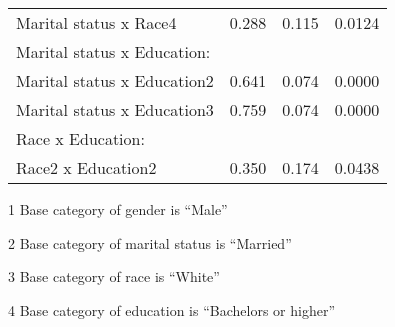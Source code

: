 \begin{table}[H]
\begin{threeparttable}
\begin{tabular}{lrcr}
  \hspace{5pt}   Marital status x Race4 		& 0.288		& 0.115 & 0.0124 \\ 
Marital status x Education: & & & \\
  \hspace{5pt}   Marital status x Education2 		& 0.641		& 0.074 & 0.0000 \\ 
  \hspace{5pt}   Marital status x Education3 		& 0.759		& 0.074 & 0.0000 \\ 
Race x Education: & & & \\
  \hspace{5pt}   Race2 x Education2 			& 0.350		& 0.174 & 0.0438 \\ 
  \hline
\end{tabular}
\begin{tablenotes}\footnotesize
\item[1] Base category of gender is ``Male''
\item[2] Base category of marital status is ``Married''
\item[3] Base category of race is ``White''
\item[4] Base category of education is ``Bachelors or higher''
\end{tablenotes}
\end{threeparttable}
\label{tab:Table3Reg}
\end{table}



